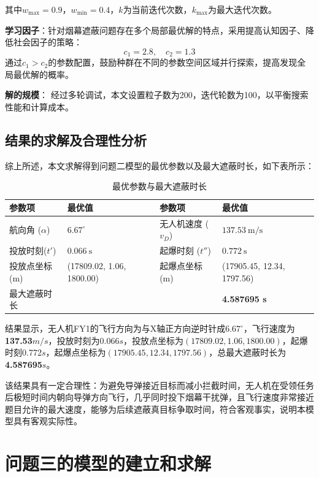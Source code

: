 \documentclass[withoutpreface,bwprint]{cumcmthesis}
\numberwithin{equation}{section} %
\numberwithin{figure}{section} %
\numberwithin{table}{section}  %
\begin{document}
其中$w_{\max} = 0.9$，$w_{\min} = 0.4$，$k$为当前迭代次数，$k_{\max}$为最大迭代次数。

\textbf{学习因子}：针对烟幕遮蔽问题存在多个局部最优解的特点，采用提高认知因子、降低社会因子的策略：
$$c_1 = 2.8, \quad c_2 = 1.3$$
通过$c_1 > c_2$的参数配置，鼓励种群在不同的参数空间区域并行探索，提高发现全局最优解的概率。

\textbf{解的规模}：
经过多轮调试，本文设置粒子数为200，迭代轮数为100，以平衡搜索性能和计算成本。

\subsection{结果的求解及合理性分析}
综上所述，本文求解得到问题二模型的最优参数以及最大遮蔽时长，如下表所示：
\begin{table}[H]
    \centering
    \caption{最优参数与最大遮蔽时长}
    \label{tab:optimal_results_final_layout}
    \begin{tabular}{ll@{\qquad}ll}
        \toprule
        \textbf{参数项} & \textbf{最优值} & \textbf{参数项} & \textbf{最优值} \\
        \midrule
        航向角 ($\alpha$) & $6.67^\circ$ & 无人机速度 ($v_D$) & $137.53~\mathrm{m/s}$ \\
         投放时刻($t'$) & $0.066~\mathrm{s}$     & 起爆时刻 ($t''$) & $0.772~\mathrm{s}$ \\
        投放点坐标(m) & (17809.02, 1.06, 1800.00) & 起爆点坐标(m) & (17905.45, 12.34, 1797.56) \\
        \midrule
        最大遮蔽时长 & & & \textbf{4.587695 s} \\
        \bottomrule
    \end{tabular}
\end{table}

结果显示，无人机FY1的飞行方向为与X轴正方向逆时针成\textbf{$6.67^\circ$}，飞行速度为\textbf{137.53$m/s$}，投放时刻为0.066$s$，投放点坐标为\textbf{$(17809.02, 1.06, 1800.00)$}，起爆时刻0.772$s$，起爆点坐标为\textbf{$(17905.45, 12.34, 1797.56)$}，总最大遮蔽时长为\textbf{4.587695$s$}。

该结果具有一定合理性：为避免导弹接近目标而减小拦截时间，无人机在受领任务后极短时间内朝向导弹方向飞行，几乎同时投下烟幕干扰弹，且飞行速度非常接近题目允许的最大速度，能够为后续遮蔽真目标争取时间，符合客观事实，说明本模型具有客观实际性。

\section{问题三的模型的建立和求解}
\end{document}
